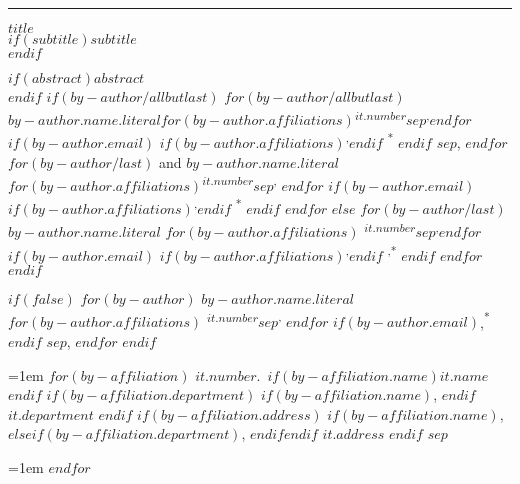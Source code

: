 
\raggedleft %
\thispagestyle{empty}
\rule{1pt}{\textheight} %
\hspace{0.05\textwidth} %
\begin{minipage}[b][\textheight][s]{0.85\textwidth}

\raggedright
{\huge\bfseries\nohyphens{$title$}}\\[1.25\baselineskip] 
$if(subtitle)${\large\textit{$subtitle$}}\\[4\baselineskip]$endif$

$if(abstract)${\large\textit{$abstract$}}\\[4\baselineskip]$endif$
$if(by-author/allbutlast)$
$for(by-author/allbutlast)$
 {\large{$by-author.name.literal$}}$for(by-author.affiliations)${\textsuperscript{$it.number$}}$sep$\textsuperscript{,}$endfor$%
$if(by-author.email)$%
$if(by-author.affiliations)$\textsuperscript{,}$endif$%
{\textsuperscript{*}}%
$endif$%
$sep$, 
$endfor$
$for(by-author/last)$%
{ and \large{$by-author.name.literal$}}%
$for(by-author.affiliations)${\textsuperscript{$it.number$}}$sep$\textsuperscript{,}%
$endfor$%
$if(by-author.email)$%
$if(by-author.affiliations)$\textsuperscript{,}$endif$%
{\textsuperscript{*}}%
$endif$%
$endfor$
$else$
$for(by-author/last)$%
{\large{$by-author.name.literal$}}%
$for(by-author.affiliations)$%
{\textsuperscript{$it.number$}}$sep$\textsuperscript{,}$endfor$%
$if(by-author.email)$%
$if(by-author.affiliations)$\textsuperscript{,}$endif$%
{\textsuperscript{,*}}%
$endif$%
$endfor$
$endif$

$if(false)$%
$for(by-author)$%
{$by-author.name.literal$}%
$for(by-author.affiliations)$%
{\textsuperscript{$it.number$}}$sep${\textsuperscript{,}}%
$endfor$%
$if(by-author.email)$,{\textsuperscript{*}}%
$endif$%
$sep$, %
$endfor$%
$endif$

\vspace{2\baselineskip} 

\hangindent=1em
$for(by-affiliation)$%
{$it.number$}.~$if(by-affiliation.name)${$it.name$}$endif$%
$if(by-affiliation.department)$%
$if(by-affiliation.name)$, $endif$%
{$it.department$}%
$endif$%
$if(by-affiliation.address)$%
$if(by-affiliation.name)$, $else$$if(by-affiliation.department)$, $endif$$endif$%
{$it.address$}%
$endif$%
$sep$\par\hangindent=1em%
$endfor$


\end{minipage}
